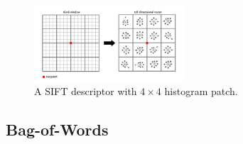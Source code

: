 \begin{itemize}
	\begin{figure}[ht!]
		\centering
		\includegraphics[width=0.5\textwidth]{figures/cv_image_processing_SIFT.jpg}
		\caption{A SIFT descriptor with $4\times 4$ histogram patch.}
		\label{fig:descriptor_SIFT}
	\end{figure}
\end{itemize}
\subsection{Bag-of-Words}
